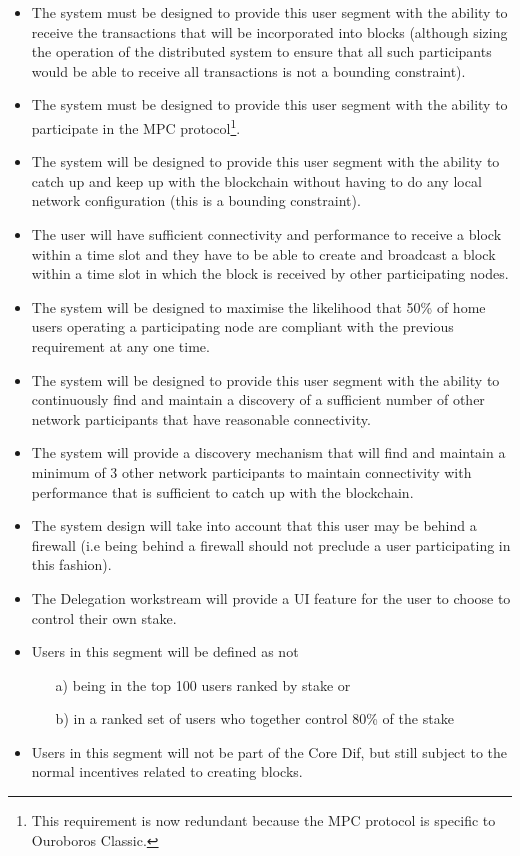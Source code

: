 \documentclass{report}
\theoremstyle{definition}{
  \newtheorem{lemma}{Lemma}[section] %
  \newtheorem{definition}[lemma]{Definition}
}
\theoremstyle{theorem}{
  \newtheorem{invariant}[lemma]{Invariant}
  \newtheorem{proofobligation}[lemma]{Proof Obligation}
}
\numberwithin{equation}{lemma}
\begin{document}
\begin{itemize}
\item The system must be designed to provide this user segment with the ability to
      receive the transactions that will be incorporated into blocks (although
      sizing the operation of the distributed system to ensure that all such
      participants would be able to receive all transactions is not a bounding
      constraint).
\item The system must be designed to provide this user segment with the ability to
      participate in the MPC protocol\footnote{This requirement is now
      redundant because the MPC protocol is specific to Ouroboros Classic.}.
\item The system will be designed to provide this user segment with the ability
      to catch up and keep up with the blockchain without having to do any local
      network configuration (this is a bounding constraint).
\item The user will have sufficient connectivity and performance to receive a
      block within a time slot {\sc and} they have to be able to create and
      broadcast a block within a time slot in which the block is received by
      other participating nodes.
\item The system will be designed to maximise the likelihood that 50\% of home
      users operating a participating node are compliant with the previous requirement
      at any one time.
\item The system will be designed to provide this user segment with the ability
      to continuously find and maintain a discovery of a sufficient number of
      other network participants that have reasonable connectivity.
\item The system will provide a discovery mechanism that will find and maintain
      a minimum of 3 other network participants to maintain connectivity with
      performance that is sufficient to catch up with the blockchain.
\item The system design will take into account that this user may be behind a
      firewall (i.e being behind a firewall should not preclude a user
      participating in this fashion).
\item The Delegation workstream will provide a UI feature for the user to
      choose to control their own stake.
\item Users in this segment will be defined as {\sc not}
      \begin{itemize}
      \item[a)] being in the top 100 users ranked by stake or
      \item[b)] in a ranked set of users who together control 80\% of the stake
      \end{itemize}
\item Users in this segment will not be part of the Core Dif, but still
      subject to the normal incentives related to creating blocks.
\end{itemize}
\end{document}
